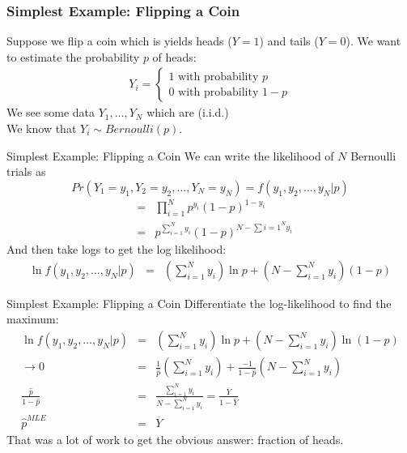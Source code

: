 \documentclass[xcolor=pdftex,dvipsnames,table,mathserif,aspectratio=169]{beamer}
\begin{document}
\begin{frame}
\frametitle{Simplest Example: Flipping a Coin}
Suppose we flip a coin which is yields heads ($Y=1$) and tails ($Y=0$). We want to estimate the probability $p$ of heads:
\begin{eqnarray*}
Y_i =
\begin{cases}
1 \mbox{ with probability } p \\
0 \mbox{ with probability } 1-p
\end{cases}
\end{eqnarray*}
We see some data $Y_1,\ldots,Y_N$ which are (i.i.d.)\\
\vspace{0.2cm}
We know that $Y_i \sim Bernoulli(p)$.
\end{frame}


\begin{frame}{Simplest Example: Flipping a Coin}
We can write the likelihood of $N$ Bernoulli trials as 
$$Pr(Y_1 = y_1, Y_2=y_2,\ldots,Y _N=y_N )  =  f(y_1,y_2,\ldots,y_N | p ) $$
\begin{eqnarray*}
&=& \prod_{i=1}^N p^{y_i} (1-p)^{1-y_i}\\
&=& p^{\sum_{i=1}^N y_i} (1-p)^{N-\sum{i=1}^N y_i}
\end{eqnarray*}
And then take logs to get the \alert{log likelihood}:
\begin{eqnarray*}
\ln  f(y_1,y_2,\ldots,y_N | p )  &=& \left( \sum_{i=1}^N y_i \right)  \ln p  + \left(N-\sum_{i=1}^N y_i \right)  (1-p)
\end{eqnarray*}
\end{frame}

\begin{frame}{Simplest Example: Flipping a Coin}
Differentiate the log-likelihood to find the maximum:
\begin{eqnarray*}
\ln  f(y_1,y_2,\ldots,y_N | p )  &=& \left( \sum_{i=1}^N y_i \right)  \ln p  + \left(N-\sum_{i=1}^N y_i \right)  \ln(1-p)\\
\rightarrow 0&=& \frac{1}{\hat{p}}  \left( \sum_{i=1}^N y_i \right) + \frac{-1}{1-\hat{p}}   \left(N-\sum_{i=1}^N y_i \right) \\
 \frac{\hat{p}}{1-\hat{p}} &=& \frac{\sum_{i=1}^N y_i }{N- \sum_{i=1}^N y_i } = \frac{\overline{Y}}{1-\overline{Y}} \\
\hat{p}^{MLE} &=& \overline{Y}
\end{eqnarray*}
That was a lot of work to get the obvious answer: \alert{fraction of heads}.
\end{frame}
\end{document}
